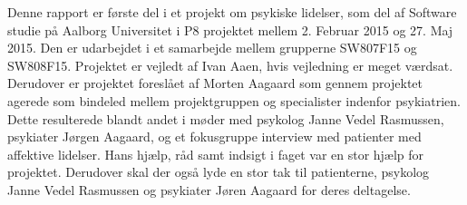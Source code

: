 Denne rapport er første del i et projekt om psykiske lidelser, som del af Software studie på Aalborg Universitet i P8 projektet mellem 2. Februar 2015 og 27. Maj 2015. 
Den er udarbejdet i et samarbejde mellem grupperne SW807F15 og SW808F15.
Projektet er vejledt af Ivan Aaen, hvis vejledning er meget værdsat.
Derudover er projektet foreslået af Morten Aagaard som gennem projektet agerede som bindeled mellem projektgruppen og specialister indenfor psykiatrien. Dette resulterede blandt andet i møder med psykolog Janne Vedel Rasmussen, psykiater Jørgen Aagaard, og et fokusgruppe interview med patienter med affektive lidelser. Hans hjælp, råd samt indsigt i faget var en stor hjælp for projektet.
Derudover skal der også lyde en stor tak til patienterne, psykolog Janne Vedel Rasmussen og psykiater Jøren Aagaard for deres deltagelse.